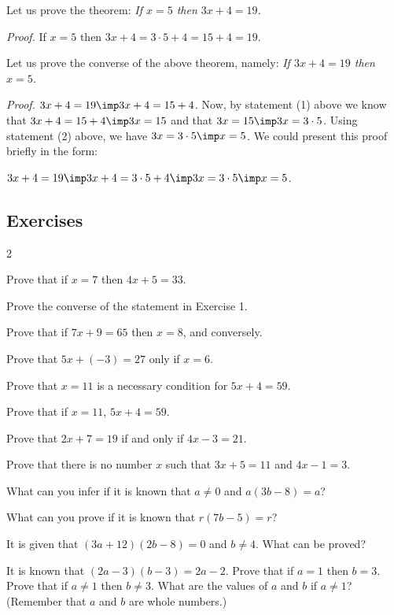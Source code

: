 \documentclass[11pt]{book}
\theoremstyle{bkplain}
\theoremstyle{XIplainnote}
\theoremstyle{bkplain}
\theoremstyle{bkplain}
\begin{document}
Let us prove the theorem: \emph{If $x = 5$ then $3x + 4 = 19$.}

\medskip
\noindent\emph{Proof.} If $x = 5$ then $3x + 4 = 3 \cdot 5 + 4 = 15 + 4 = 19$.

\medskip
Let us prove the converse of the above theorem, namely: \emph{If $3x + 4 = 19$
then $x = 5$.}

\medskip
\noindent\emph{Proof.} $3x + 4 = 19 \imp 3x + 4 = 15 + 4$. Now, by statement (1)
above we know that $3x + 4 = 15 + 4 \imp 3x = 15$ and that $3x = 15 \imp 3x =
3 \cdot 5$. Using statement (2) above, we have $3x = 3 \cdot 5 \imp x = 5$. We
could present this proof briefly in the form:

\begin{center}
$3x + 4 = 19 \imp 3x + 4 = 3 \cdot 5 + 4 \imp 3x = 3 \cdot 5 \imp x = 5$.
\end{center}

\subsection*{Exercises}

\begin{multicols}{2}
\begin{exlist}
\item Prove that if $x = 7$ then $4x + 5 = 33$.
\item Prove the converse of the statement in Exercise 1.
\item Prove that if $7x + 9 = 65$ then $x = 8$, and conversely.
\item Prove that $5x + (-3) = 27$ only if $x = 6$.
\item Prove that $x = 11$ is a necessary condition for $5x + 4 = 59$.
\item Prove that if $x = 11$, $5x + 4 = 59$.
\item Prove that $2x + 7 = 19$ if and only if $4x - 3 = 21$.
\item Prove that there is no number $x$ such that $3x + 5 = 11$ and $4x - 1 = 3$.
\item What can you infer if it is known that $a \neq 0$ and $a(3b - 8) = a$?
\item What can you prove if it is known that $r(7b - 5) = r$?
\item It is given that $(3a + 12)(2b - 8) = 0$ and $b \neq 4$. What can be proved?
\item[\stex 12.] It is known that $(2a - 3)(b - 3) = 2a - 2$. Prove that if
      $a = 1$ then $b = 3$. Prove that if $a \neq 1$ then $b \neq 3$. What are the
      values of $a$ and $b$ if $a \neq 1$? (Remember that $a$ and $b$ are whole
      numbers.)
\end{exlist}
\end{multicols}
\clearpage
\setcounter{theorem}{0}\setcounter{definition}{0}\setcounter{construction}{0}\setcounter{exgroup}{0}\setcounter{footnote}{0}
\setcounter{chapter}{3}
\end{document}
